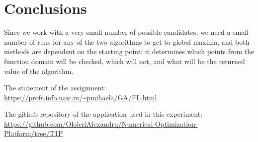 \documentclass[a4paper]{article}
\begin{document}
\section{Conclusions}

Since we work with a very small number of possible candidates, we need a small number of runs for any of the two algorithms to get to global maxima, and both methods are dependent on the starting point: it determines which points from the function domain will be checked, which will not, and what will be the returned value of the algorithm.

\begin{thebibliography}{9}

	The statement of the assignment:
	\url{https://profs.info.uaic.ro/~pmihaela/GA/FL.html}

	The github repository of the application used in this experiment:
	\url{https://github.com/OloieriAlexandru/Numerical-Optimization-Platform/tree/T1P}
	
\end{thebibliography}
	
\end{document}
